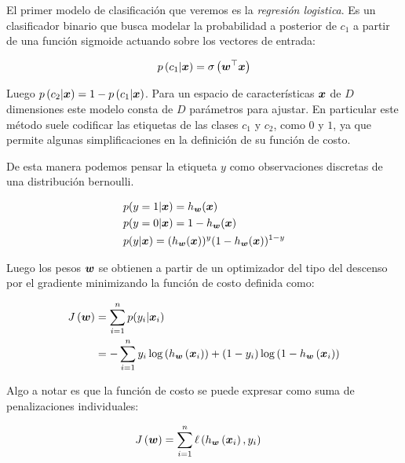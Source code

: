 El primer modelo de clasificación que veremos es la \emph{regresión logistica}.
Es un clasificador binario que busca modelar la probabilidad a posterior de
$c_1$ a partir de una función sigmoide actuando sobre los vectores de entrada:

\begin{align}
    p\left( c_1 | \boldsymbol{x} \right) = \sigma\left( \boldsymbol{w}^{\top} \boldsymbol{x} \right)
\end{align}

Luego $p\left( c_2 | \boldsymbol{x} \right) = 1 - p\left( c_1 | \boldsymbol{x} \right)$.
Para un espacio de características $\boldsymbol{x}$ de $D$ dimensiones este modelo
consta de $D$ parámetros para ajustar. En particular este método suele codificar
las etiquetas de las clases $c_1$ y $c_2$, como $0$ y $1$, ya que permite
algunas simplificaciones en la definición de su función de costo.

De esta manera podemos pensar la etiqueta $y$ como observaciones discretas de
una distribución bernoulli.

\begin{align}
    & p(y = 1 | \boldsymbol{x}) = h_{\boldsymbol{w}}(\boldsymbol{x}) \\
    & p(y = 0 | \boldsymbol{x}) = 1 - h_{\boldsymbol{w}}(\boldsymbol{x}) \\
    & p(y | \boldsymbol{x}) = (h_{\boldsymbol{w}}(\boldsymbol{x}))^{y}(1 - h_{\boldsymbol{w}}(\boldsymbol{x}))^{1 - y}
\end{align}

Luego los pesos $\boldsymbol{w}$ se obtienen a partir de un optimizador del tipo del
descenso por el gradiente minimizando la función de costo definida como:

\begin{align}
    J\left( \boldsymbol{w} \right) &= \sum_{i=1}^{n} p(y_{i} | \boldsymbol{x}_{i}) \\
                             &= -\sum_{i=1}^{n}
                                    y_{i}\log\left( h_{\boldsymbol{w}}\left( \boldsymbol{x}_{i} \right) \right) +
                                    (1 - y_{i})\log\left(1 - h_{\boldsymbol{w}}\left( \boldsymbol{x}_{i} \right) \right)
\end{align}

Algo a notar es que la función de costo se puede expresar como suma de
penalizaciones individuales:

\begin{align}
    J\left( \boldsymbol{w} \right) &= \sum_{i=1}^{n} \ell\left( h_{\boldsymbol{w}}\left( \boldsymbol{x}_{i}\right), y_{i}\right)
\end{align}

